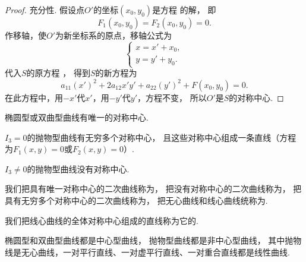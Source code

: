 \begin{theorem}
\begin{proof}
充分性.
假设点\(O'\)的坐标\((x_0,y_0)\)是方程  的解，
即\begin{equation*}
	F_1(x_0,y_0) = F_2(x_0,y_0) = 0.
\end{equation*}
作移轴，使\(O'\)为新坐标系的原点，移轴公式为\begin{equation*}
	\left\{ \begin{array}{l}
		x = x' + x_0, \\
		y = y' + y_0.
	\end{array} \right.
\end{equation*}
代入\(S\)的原方程 ，
得到\(S\)的新方程为\begin{equation*}
	a_{11} (x')^2
	+ 2 a_{12} x' y'
	+ a_{22} (y')^2
	+ F(x_0,y_0)
	= 0.
\end{equation*}
在此方程中，用\(-x'\)代\(x'\)，用\(-y'\)代\(y'\)，方程不变，
所以\(O'\)是\(S\)的对称中心.
\end{proof}
\end{theorem}

\begin{theorem}
椭圆型或双曲型曲线有唯一的对称中心.
\end{theorem}

\begin{theorem}
\(I_3 = 0\)的抛物型曲线有无穷多个对称中心，
且这些对称中心组成一条直线（方程为\(F_1(x,y) = 0\)或\(F_2(x,y) = 0\)）.
\end{theorem}

\begin{theorem}
\(I_3 \neq 0\)的抛物型曲线没有对称中心.
\end{theorem}

我们把具有唯一对称中心的二次曲线称为，
把没有对称中心的二次曲线称为，
把具有无穷多个对称中心的二次曲线称为，
把无心曲线和线心曲线统称为.

我们把线心曲线的全体对称中心组成的直线称为它的.

椭圆型和双曲型曲线都是中心型曲线，
抛物型曲线都是非中心型曲线，
其中抛物线是无心曲线，一对平行直线、一对虚平行直线、一对重合直线都是线性曲线.

